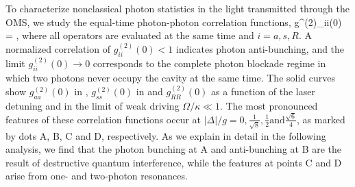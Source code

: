 To  characterize nonclassical 
photon statistics in the light transmitted through the OMS,
we study the equal-time photon-photon correlation
functions,
\bel
	\label{eq:g2(0)}
	g^{(2)}_{ii}(0)
	=  ,
\eel
where all operators are evaluated at the same time and $i = a,s, R$. 
A normalized correlation of
$g^{(2)}_{ii}(0)< 1$ indicates photon anti-bunching, and the limit
$g^{(2)}_{ii}(0)\rightarrow 0$ corresponds to the 
complete photon blockade regime
in which two photons never occupy the cavity
at the same time.
The solid curves show $g^{(2)}_{aa}(0)$ in ,
$g^{(2)}_{ss}(0)$ in  and $g^{(2)}_{RR}(0)$ 
 as a function of the laser  detuning and in the limit of
weak driving $\Omega/\kappa \ll1 $.
The most pronounced features of these correlation functions occur at 
$|\Delta|/g = 0, \frac{1}{\sqrt{8}}, \frac{1}{2} \mathrm{ and }\frac{\sqrt{6}}{4}$, 
as marked by
dots A, B, C and D, respectively. 
As we explain in detail in the following analysis, 
we find that the photon bunching at A and
anti-bunching at B are the result of destructive 
quantum interference, while the 
features at points C and D arise from 
one- and two-photon resonances. 


